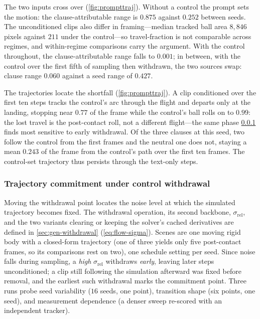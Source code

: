 The two inputs cross over (\cref{fig:prompttraj}). Without a control the prompt sets the motion: the clause-attributable range is $0.875$ against $0.252$ between seeds. The unconditioned clips also differ in framing---median tracked ball area $8{,}846$ pixels against $211$ under the control---so travel-fraction is not comparable across regimes, and within-regime comparisons carry the argument. With the control throughout, the clause-attributable range falls to $0.001$; in between, with the control over the first fifth of sampling then withdrawn, the two sources swap: clause range $0.060$ against a seed range of $0.427$.

The trajectories locate the shortfall (\cref{fig:prompttraj}). A clip conditioned over the first ten steps tracks the control's arc through the flight and departs only at the landing, stopping near $0.77$ of the frame while the control's ball rolls on to $0.99$: the lost travel is the post-contact roll, not a different flight---the same phase \cref{sec:gen-release} finds most sensitive to early withdrawal. Of the three clauses at this seed, two follow the control from the first frames and the neutral one does not, staying a mean $0.243$ of the frame from the control's path over the first ten frames. The control-set trajectory thus persists through the text-only steps.
\subsubsection{Trajectory commitment under control withdrawal}\label{sec:gen-release}

Moving the withdrawal point locates the noise level at which the simulated trajectory becomes fixed. The withdrawal operation, its second backbone, $\sigma_{\mathrm{rel}}$, and the two variants clearing or keeping the solver's cached derivatives are defined in \cref{sec:gen-withdrawal} (\cref{eq:flow-sigma}). Scenes are one moving rigid body with a closed-form trajectory (one of three yields only five post-contact frames, so its comparisons rest on two), one schedule setting per seed. Since noise falls during sampling, a \emph{high} $\sigma_{\mathrm{rel}}$ withdraws \emph{early}, leaving later steps unconditioned; a clip still following the simulation afterward was fixed before removal, and the earliest such withdrawal marks the commitment point. Three runs probe seed variability ($16$ seeds, one point), transition shape (six points, one seed), and measurement dependence (a denser sweep re-scored with an independent tracker).

